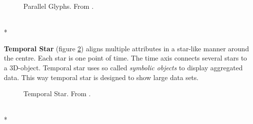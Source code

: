 \begin{figure}[H]
    \centering
    \caption{Parallel Glyphs. From  \cite{Aigner2011}.}
    \label{fig:parallelglyphs}
\end{figure}\\*

\textbf{Temporal Star} (figure \ref{fig:temporalstar}) aligns multiple attributes in a star-like manner around the centre. Each star is one point of time. The time axis connects several stars to a 3D-object. Temporal star uses so called \textit{symbolic objects} to display aggregated data. This way temporal star is designed to show large data sets. 
\begin{figure}[H]
    \centering
    \caption{Temporal Star. From  \cite{Aigner2011}.}
    \label{fig:temporalstar}
\end{figure}\\*

